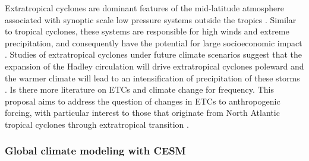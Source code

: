 \documentclass[11pt]{article}
\begin{document}
Extratropical cyclones are dominant features of the mid-latitude atmosphere associated with synoptic scale low pressure systems outside the tropics \citep{serreze1995climatological}.  Similar to tropical cyclones, these systems are responsible for high winds and extreme precipitation, and consequently have the potential for large socioeconomic impact \citep{ulbrich2009extra}.  Studies of extratropical cyclones under future climate scenarios suggest that the expansion of the Hadley circulation will drive extratropical cyclones poleward \citep{bengtsson2006storm} and the warmer climate will lead to an intensification of precipitation of these storms \citep{bengtsson2009will, zappa2013multi}.  {\color{red} Is there more literature on ETCs and climate change for frequency}. This proposal aims to address the question of changes in ETCs to anthropogenic forcing, with particular interest to those that originate from North Atlantic tropical cyclones through extratropical transition \citep{hart2001climatology}.  

\subsubsection{Global climate modeling with CESM} \label{sec:cesm-description}
\end{document}
